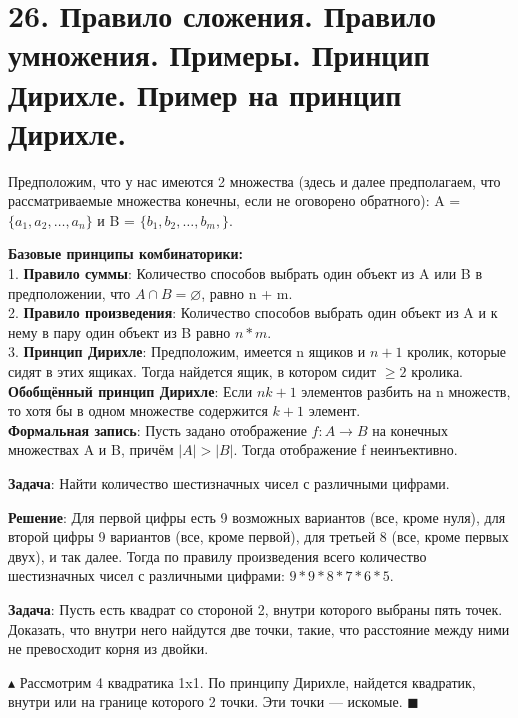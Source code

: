 \section*{26. Правило сложения. Правило умножения. Примеры. Принцип Дирихле. Пример на принцип Дирихле.}
Предположим, что у нас имеются 2 множества (здесь и далее предполагаем, что рассматриваемые множества конечны, если не оговорено обратного): A = $\{ a_1, a_2, \dots, a_n \}$ и B = $\{ b_1, b_2, \dots, b_m, \}$. \par
\textbf{Базовые принципы комбинаторики:} \\
1. \textbf{Правило суммы}: Количество способов выбрать один объект из A или B в предположении, что $A \cap B = \varnothing$, равно n + m. \\
2. \textbf{Правило произведения}: Количество способов выбрать один объект из A и к нему в пару один объект из B равно $n*m$.\\
3. \textbf{Принцип Дирихле}: Предположим, имеется n ящиков и $n+1$ кролик, которые сидят в этих ящиках. Тогда найдется ящик, в котором сидит $\geqslant 2$ кролика. \\
\textbf{Обобщённый принцип Дирихле}: Если $nk + 1$ элементов разбить на n множеств, то хотя бы в одном множестве содержится $k+1$ элемент.  \\
\textbf{Формальная запись}: Пусть задано отображение $f: A \rightarrow B$ на конечных множествах A и B, причём $|A| > |B|$. Тогда отображение f неинъективно. \\ \par
\textbf{Задача}: Найти количество шестизначных чисел с различными цифрами.\par \textbf{Решение}: Для первой цифры есть 9 возможных вариантов (все, кроме нуля), для второй цифры 9 вариантов (все, кроме первой), для третьей 8 (все, кроме первых двух), и так далее. Тогда по правилу произведения всего количество шестизначных чисел с различными цифрами: $9*9*8*7*6*5$. \par
\textbf{Задача}: Пусть есть квадрат со стороной 2, внутри которого выбраны пять точек. Доказать, что внутри него найдутся две точки, такие, что расстояние между ними не превосходит корня из двойки. \par
$\blacktriangle$
Рассмотрим 4 квадратика 1x1. По принципу Дирихле, найдется квадратик, внутри или на границе которого 2 точки. Эти точки — искомые.
$\blacksquare$

